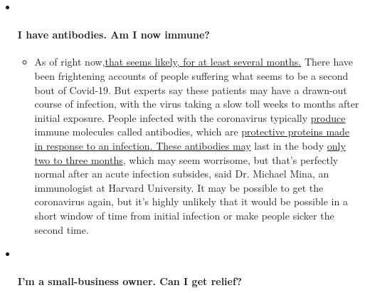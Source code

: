 \begin{itemize}
\item ~
  \hypertarget{i-have-antibodies-am-i-now-immune}{%
  \paragraph{I have antibodies. Am I now
  immune?}\label{i-have-antibodies-am-i-now-immune}}

  \begin{itemize}
  \tightlist
  \item
    As of right
    now,\href{https://www.nytimes.com/2020/07/22/health/covid-antibodies-herd-immunity.html?action=click\&pgtype=Article\&state=default\&region=MAIN_CONTENT_3\&context=storylines_faq}{that
    seems likely, for at least several months.} There have been
    frightening accounts of people suffering what seems to be a second
    bout of Covid-19. But experts say these patients may have a
    drawn-out course of infection, with the virus taking a slow toll
    weeks to months after initial exposure. People infected with the
    coronavirus typically
    \href{https://www.nature.com/articles/s41586-020-2456-9}{produce}
    immune molecules called antibodies, which are
    \href{https://www.nytimes.com/2020/05/07/health/coronavirus-antibody-prevalence.html?action=click\&pgtype=Article\&state=default\&region=MAIN_CONTENT_3\&context=storylines_faq}{protective
    proteins made in response to an
    infection}\href{https://www.nytimes.com/2020/05/07/health/coronavirus-antibody-prevalence.html?action=click\&pgtype=Article\&state=default\&region=MAIN_CONTENT_3\&context=storylines_faq}{.
    These antibodies may} last in the body
    \href{https://www.nature.com/articles/s41591-020-0965-6}{only two to
    three months}, which may seem worrisome, but that's perfectly normal
    after an acute infection subsides, said Dr. Michael Mina, an
    immunologist at Harvard University. It may be possible to get the
    coronavirus again, but it's highly unlikely that it would be
    possible in a short window of time from initial infection or make
    people sicker the second time.
  \end{itemize}
\item ~
  \hypertarget{im-a-small-business-owner-can-i-get-relief}{%
  \paragraph{I'm a small-business owner. Can I get
  relief?}\label{im-a-small-business-owner-can-i-get-relief}}


\end{itemize}

